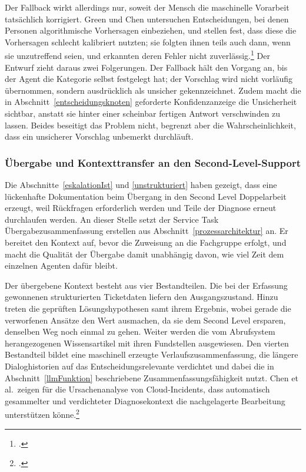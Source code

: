 Der Fallback wirkt allerdings nur, soweit der Mensch die maschinelle Vorarbeit tats\"achlich korrigiert. Green und Chen untersuchen Entscheidungen, bei denen Personen algorithmische Vorhersagen einbeziehen, und stellen fest, dass diese die Vorhersagen schlecht kalibriert nutzten; sie folgten ihnen teils auch dann, wenn sie unzutreffend seien, und erkannten deren Fehler nicht zuverl\"assig.\footcite[Vgl.][hier S.~1]{GreenChen2019} Der Entwurf zieht daraus zwei Folgerungen. Der Fallback h\"alt den Vorgang an, bis der Agent die Kategorie selbst festgelegt hat; der Vorschlag wird nicht vorl\"aufig \"ubernommen, sondern ausdr\"ucklich als unsicher gekennzeichnet. Zudem macht die in Abschnitt~\ref{entscheidungsknoten} geforderte Konfidenzanzeige die Unsicherheit sichtbar, anstatt sie hinter einer scheinbar fertigen Antwort verschwinden zu lassen. Beides beseitigt das Problem nicht, begrenzt aber die Wahrscheinlichkeit, dass ein unsicherer Vorschlag unbemerkt durchl\"auft.

\subsubsection{Übergabe und Kontexttransfer an den Second-Level-Support}
\label{kontexttransfer}

Die Abschnitte~\ref{eskalationIst} und \ref{unstrukturiert} haben gezeigt, dass eine l\"uckenhafte Dokumentation beim \"Ubergang in den Second Level Doppelarbeit erzeugt, weil R\"uckfragen erforderlich werden und Teile der Diagnose erneut durchlaufen werden. An dieser Stelle setzt der Service Task \glqq \"Ubergabezusammenfassung erstellen\grqq{} aus Abschnitt~\ref{prozessarchitektur} an. Er bereitet den Kontext auf, bevor die Zuweisung an die Fachgruppe erfolgt, und macht die Qualit\"at der \"Ubergabe damit unabh\"angig davon, wie viel Zeit dem einzelnen Agenten daf\"ur bleibt.

Der \"ubergebene Kontext besteht aus vier Bestandteilen. Die bei der Erfassung gewonnenen strukturierten Ticketdaten liefern den Ausgangszustand. Hinzu treten die gepr\"uften L\"osungshypothesen samt ihrem Ergebnis, wobei gerade die verworfenen Ans\"atze den Wert ausmachen, da sie dem Second Level ersparen, denselben Weg noch einmal zu gehen. Weiter werden die vom Abrufsystem herangezogenen Wissensartikel mit ihren Fundstellen ausgewiesen. Den vierten Bestandteil bildet eine maschinell erzeugte Verlaufszusammenfassung, die l\"angere Dialoghistorien auf das Entscheidungsrelevante verdichtet und dabei die in Abschnitt~\ref{llmFunktion} beschriebene Zusammenfassungsf\"ahigkeit nutzt. Chen et al.~zeigen f\"ur die Ursachenanalyse von Cloud-Incidents, dass automatisch gesammelter und verdichteter Diagnosekontext die nachgelagerte Bearbeitung unterst\"utzen k\"onne.\footcite[Vgl.][hier S.~674\,f.]{Chen2024}

